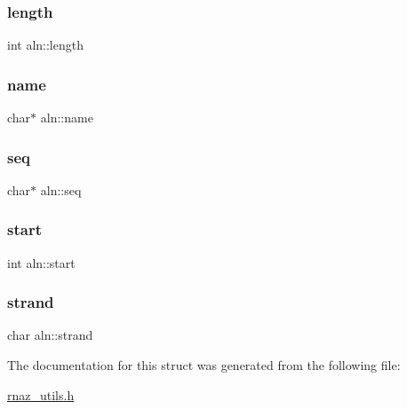 \mbox{\label{structaln_ad03a776f899ce00d63827146906ab6b4}} 
\subsubsection{\texorpdfstring{length}{length}}
{\footnotesize\ttfamily int aln\+::length}

\mbox{\label{structaln_af655f033b20fc2f4361576240cac2c0f}} 
\subsubsection{\texorpdfstring{name}{name}}
{\footnotesize\ttfamily char$\ast$ aln\+::name}

\mbox{\label{structaln_aee1fbffa2c18c0b3d6016b8fe409eeae}} 
\subsubsection{\texorpdfstring{seq}{seq}}
{\footnotesize\ttfamily char$\ast$ aln\+::seq}

\mbox{\label{structaln_a1cde67bfa55bc9e8f2d98f9e53a4ba12}} 
\subsubsection{\texorpdfstring{start}{start}}
{\footnotesize\ttfamily int aln\+::start}

\mbox{\label{structaln_aa3a2e698a569a230e9e14e14d3afe653}} 
\subsubsection{\texorpdfstring{strand}{strand}}
{\footnotesize\ttfamily char aln\+::strand}



The documentation for this struct was generated from the following file\+:\begin{DoxyCompactItemize}
\item 
\hyperlink{rnaz__utils_8h}{rnaz\+\_\+utils.\+h}\end{DoxyCompactItemize}
